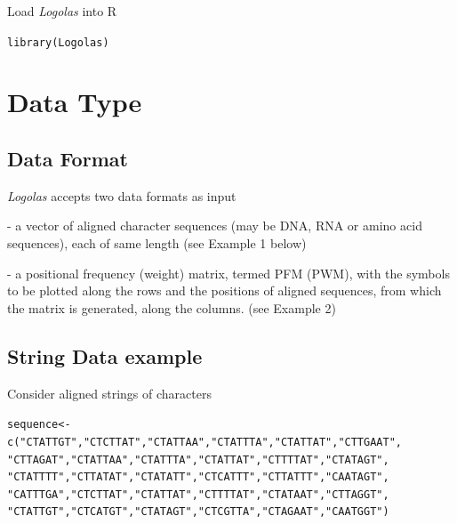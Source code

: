 \documentclass[12pt]{article}\usepackage[]{graphicx}\usepackage[usenames,dvipsnames]{color}
\newcommand{\hlstr}[1]{\textcolor[rgb]{0.251,0.627,0.251}{#1}}%
\newcommand{\hlstd}[1]{\textcolor[rgb]{0.251,0.251,0.251}{#1}}%
\newcommand{\hlkwb}[1]{\textcolor[rgb]{0,0,0}{#1}}%
\newcommand{\hlkwd}[1]{\textcolor[rgb]{0.878,0.439,0.125}{#1}}%
\newenvironment{knitrout}{}{} %
\newcommand{\Logolas}{\textit{Logolas}}
\begin{document}
Load \Logolas{} into R

\begin{knitrout}
\color{fgcolor}\begin{kframe}
\begin{alltt}
\hlkwd{library}\hlstd{(Logolas)}
\end{alltt}
\end{kframe}
\end{knitrout}

\section{Data Type}

\subsection{Data Format}

\Logolas{} accepts two data formats as input

- a vector of aligned character sequences (may be DNA, RNA or amino acid sequences), each of same length (see Example 1 below)

- a positional frequency (weight) matrix, termed PFM (PWM), with the symbols to be plotted along the rows and the positions of aligned sequences, from which the matrix is generated, along the columns. (see Example 2)

\subsection{String Data example}

Consider aligned strings of characters

\begin{knitrout}
\color{fgcolor}\begin{kframe}
\begin{alltt}
\hlstd{sequence} \hlkwb{<-} \hlkwd{c}\hlstd{(}\hlstr{"CTATTGT"}\hlstd{,} \hlstr{"CTCTTAT"}\hlstd{,} \hlstr{"CTATTAA"}\hlstd{,} \hlstr{"CTATTTA"}\hlstd{,} \hlstr{"CTATTAT"}\hlstd{,} \hlstr{"CTTGAAT"}\hlstd{,}
              \hlstr{"CTTAGAT"}\hlstd{,} \hlstr{"CTATTAA"}\hlstd{,} \hlstr{"CTATTTA"}\hlstd{,} \hlstr{"CTATTAT"}\hlstd{,} \hlstr{"CTTTTAT"}\hlstd{,} \hlstr{"CTATAGT"}\hlstd{,}
              \hlstr{"CTATTTT"}\hlstd{,} \hlstr{"CTTATAT"}\hlstd{,} \hlstr{"CTATATT"}\hlstd{,} \hlstr{"CTCATTT"}\hlstd{,} \hlstr{"CTTATTT"}\hlstd{,} \hlstr{"CAATAGT"}\hlstd{,}
              \hlstr{"CATTTGA"}\hlstd{,} \hlstr{"CTCTTAT"}\hlstd{,} \hlstr{"CTATTAT"}\hlstd{,} \hlstr{"CTTTTAT"}\hlstd{,} \hlstr{"CTATAAT"}\hlstd{,} \hlstr{"CTTAGGT"}\hlstd{,}
              \hlstr{"CTATTGT"}\hlstd{,} \hlstr{"CTCATGT"}\hlstd{,} \hlstr{"CTATAGT"}\hlstd{,} \hlstr{"CTCGTTA"}\hlstd{,} \hlstr{"CTAGAAT"}\hlstd{,} \hlstr{"CAATGGT"}\hlstd{)}
\end{alltt}
\end{kframe}
\end{knitrout}
\end{document}
